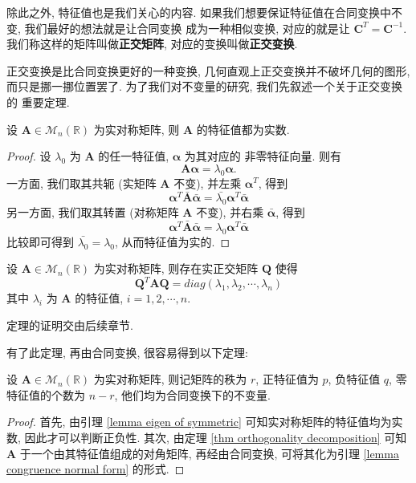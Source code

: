 \documentclass[UTF8]{book}
\begin{document}
除此之外, 特征值也是我们关心的内容. 
如果我们想要保证特征值在合同变换中不变, 我们最好的想法就是让合同变换
成为一种相似变换, 对应的就是让 $\boldsymbol{C}^T = \boldsymbol{C}^{-1}$. 
我们称这样的矩阵叫做\textbf{正交矩阵}, 对应的变换叫做\textbf{正交变换}. 

正交变换是比合同变换更好的一种变换, 几何直观上正交变换并不破坏几何的图形, 
而只是挪一挪位置罢了. 为了我们对不变量的研究, 我们先叙述一个关于正交变换的
重要定理. 

\begin{lemma} \label{lemma eigen of symmetric}
    设 $\boldsymbol{A}\in \mathcal{M}_n(\mathbb{R})$ 为实对称矩阵, 
    则 $\boldsymbol{A}$ 的特征值都为实数. 
\end{lemma}

\begin{proof}
    设 $\lambda_0$ 为 $\boldsymbol{A}$ 的任一特征值, $\boldsymbol{\alpha}$ 为其对应的
    非零特征向量. 则有 $$ \boldsymbol{A}\boldsymbol{\alpha} = 
    \lambda_0\boldsymbol{\alpha}.$$
    一方面, 我们取其共轭 (实矩阵 $\boldsymbol{A}$ 不变), 
    并左乘 $\boldsymbol{\alpha}^T$, 得到
    $$ \boldsymbol{\alpha}^T \bar{\boldsymbol{A}}\bar{\boldsymbol{\alpha}}
    = \bar{\lambda_0}\boldsymbol{\alpha}^T \bar{\boldsymbol{\alpha}} $$
    另一方面, 我们取其转置 (对称矩阵 $\boldsymbol{A}$ 不变), 
    并右乘 $\bar{\boldsymbol{\alpha}}$, 得到
    $$ \boldsymbol{\alpha}^T \bar{\boldsymbol{A}}\bar{\boldsymbol{\alpha}}
    = \lambda_0\boldsymbol{\alpha}^T \bar{\boldsymbol{\alpha}} $$
    比较即可得到 $\bar{\lambda_0} = \lambda_0$, 从而特征值为实的.
\end{proof}

\begin{theorem}\label{thm orthogonality decomposition}
    设 $\boldsymbol{A}\in \mathcal{M}_n(\mathbb{R})$ 为实对称矩阵, 
    则存在实正交矩阵 $\boldsymbol{Q}$ 使得 
    $$ \boldsymbol{Q}^T \boldsymbol{A}\boldsymbol{Q} = 
    diag(\lambda_1,\lambda_2,\cdots,\lambda_n)$$
    其中 $\lambda_i$ 为 $\boldsymbol{A}$ 的特征值, $i=1,2,\cdots,n$.
\end{theorem}

定理的证明交由后续章节. 

有了此定理, 再由合同变换, 很容易得到以下定理: 
\begin{theorem} \label{thm signal of eigen}
    设 $\boldsymbol{A}\in \mathcal{M}_n(\mathbb{R})$ 为实对称矩阵, 
    则记矩阵的秩为 $r$, 
    正特征值为 $p$, 负特征值 $q$, 零特征值的个数为 $n-r$, 
    他们均为合同变换下的不变量. 
\end{theorem}
\begin{proof}
    首先, 由引理 \ref{lemma eigen of symmetric} 可知实对称矩阵的特征值均为实数, 因此才可以判断正负性. 
    其次, 由定理 \ref{thm orthogonality decomposition} 
    可知 $\boldsymbol{A}$ 于一个由其特征值组成的对角矩阵, 
    再经由合同变换, 可将其化为引理 \ref{lemma congruence normal form} 的形式. 
\end{proof}
\end{document}
